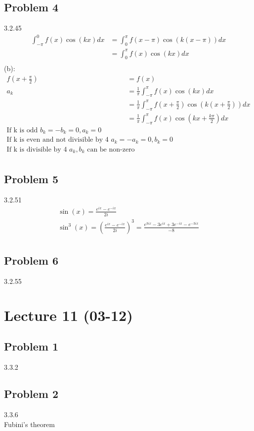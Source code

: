 \subsection*{Problem 4}
3.2.45
\begin{align*}{}{}
\int_{-\pi}^{0} f(x)\cos(kx)dx&=\int_{0}^{\pi} f(x-\pi)\cos(k(x-\pi))dx\\
&=\int_{0}^{\pi} f(x)\cos(kx)dx\\
\end{align*}
(b):
\begin{align*}{}{}
f(x+\frac{\pi}{2})&=f(x)\\
a_k&=\frac{1}{\pi}\int_{-\pi}^{\pi}f(x)\cos(kx)dx\\
&=\frac{1}{\pi}\int_{-\pi}^{\pi}f(x+\frac{\pi}{2})\cos(k(x+\frac{\pi}{2}))dx\\
&=\frac{1}{\pi}\int_{-\pi}^{\pi}f(x)\cos(kx+\frac{k\pi}{2})dx\\
\text{If k is odd } b_k=-b_k=0,a_k=0\\
\text{If k is even and not divisible by 4 } a_k=-a_k=0,b_k=0 \\
\text{If k is divisible by 4 } a_k,b_k \text{ can be non-zero}\\
\end{align*}
\subsection*{Problem 5}
3.2.51
\begin{align*}{}{}
\sin(x)=\frac{e^{ix}-e^{-ix}}{2i}\\
\sin^3(x)=(\frac{e^{ix}-e^{-ix}}{2i})^3=\frac{e^{3ix}-3e^{ix}+3e^{-ix}-e^{-3ix}}{-8}\\
\end{align*}
\subsection*{Problem 6}
3.2.55
\section{Lecture 11 (03-12)}
\subsection*{Problem 1}
3.3.2
\subsection*{Problem 2}
3.3.6
\\Fubini's theorem
